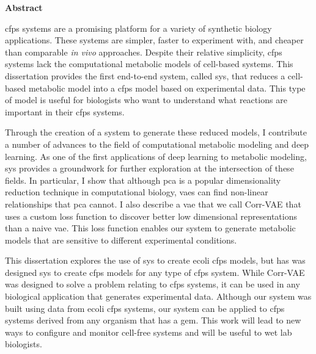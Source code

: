 \newpage
\dissertationtitle
{\Huge \bf Abstract}
\vspace{24pt} 

\gls{cfps} systems are a promising platform for a variety of synthetic biology applications.
These systems are simpler, faster to experiment with, and cheaper than comparable \textit{in vivo} approaches.
Despite their relative simplicity, \gls{cfps} systems lack the computational metabolic models of cell-based systems.
This dissertation provides the first end-to-end system, called \gls{sys}, that reduces a cell-based metabolic model into a \gls{cfps} model based on experimental data.
This type of model is useful for biologists who want to understand what reactions are important in their \gls{cfps} systems.

Through the creation of a system to generate these reduced models, I contribute a number of advances to the field of computational metabolic modeling and deep learning.
As one of the first applications of deep learning to metabolic modeling, \gls{sys} provides a groundwork for further exploration at the intersection of these fields.
In particular, I show that although \gls{pca} is a popular dimensionality reduction technique in computational biology, \glspl{vae} can find non-linear relationships that \gls{pca} cannot.
I also describe a \gls{vae} that we call Corr-VAE that uses a custom loss function to discover better low dimensional representations than a naive \gls{vae}.
This loss function enables our system to generate metabolic models that are sensitive to different experimental conditions.

This dissertation explores the use of \gls{sys} to create \gls{ecoli} \gls{cfps} models, but has  was designed \gls{sys} to create \gls{cfps} models for any type of \gls{cfps} system.
While Corr-VAE was designed to solve a problem relating to \gls{cfps} systems, it can be used in any biological application that generates experimental data.
Although our system was built using data from \gls{ecoli} \gls{cfps} systems, our system can be applied to \gls{cfps} systems derived from any organism that has a \gls{gem}.
This work will lead to new ways to configure and monitor cell-free systems and will be useful to wet lab biologists.

\newpage
\vspace*{\fill}
